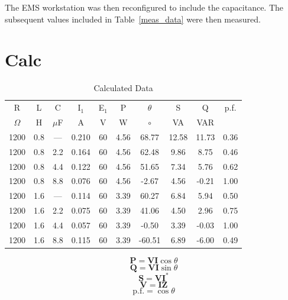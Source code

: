 \documentclass{article}
\begin{document}
The EMS workstation was then reconfigured to include the capacitance.  The
subsequent values included in Table~\ref{meas_data} were then measured.

\section{Calc}
\begin{table}[h]
  \begin{center}
    \begin{tabular}{cccccccccc}
      \hline
      R & L & C & I$_1$ & E$_1$ & P & $\theta$ & S & Q & p.f. \\
      $\Omega$ & H & $\mu$F & A & V & W & $\circ$ & VA & VAR & \\
      \hline
      1200 & 0.8 & --- & 0.210 & 60 & 4.56 &  68.77 & 12.58 & 11.73 & 0.36 \\
      1200 & 0.8 & 2.2 & 0.164 & 60 & 4.56 &  62.48 &  9.86 &  8.75 & 0.46 \\
      1200 & 0.8 & 4.4 & 0.122 & 60 & 4.56 &  51.65 &  7.34 &  5.76 & 0.62 \\
      1200 & 0.8 & 8.8 & 0.076 & 60 & 4.56 &  -2.67 &  4.56 & -0.21 & 1.00 \\
      1200 & 1.6 & --- & 0.114 & 60 & 3.39 &  60.27 &  6.84 &  5.94 & 0.50 \\
      1200 & 1.6 & 2.2 & 0.075 & 60 & 3.39 &  41.06 &  4.50 &  2.96 & 0.75 \\
      1200 & 1.6 & 4.4 & 0.057 & 60 & 3.39 &  -0.50 &  3.39 & -0.03 & 1.00 \\
      1200 & 1.6 & 8.8 & 0.115 & 60 & 3.39 & -60.51 &  6.89 & -6.00 & 0.49 \\
      \hline
    \end{tabular}
    \caption{Calculated Data}
    \label{calc_data}
  \end{center}
\end{table}

\[\mathbf{P} = \mathbf{VI}\cos\theta \]
\[\mathbf{Q} = \mathbf{VI}\sin\theta\]
\[\mathbf{S} = \mathbf{VI}^*\]
\[\mathbf{V} = \mathbf{IZ}\]
\[\text{p.f.} = \cos\theta\]
\end{document}
